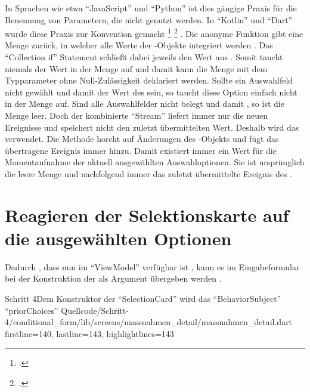 In Sprachen wie etwa \enquote{JavaScript} und \enquote{Python} ist dies gängige Praxis für die Benennung von Parametern,
die nicht genutzt werden.
In \enquote{Kotlin} und \enquote{Dart} wurde diese Praxis zur Konvention gemacht
\footcite[Vgl.][]{DartEffectiveDartStylePREFERusingUnderscore}
\footcite[Vgl.][]{KotlinHighOrderFunctionsAndLambdasUnderscoreForUnusedVariables}
. 
Die anonyme Funktion gibt eine Menge zurück,
in welcher alle Werte der -Objekte integriert werden .
Das \enquote{Collection if} Statement schließt dabei jeweils den Wert  aus .
Somit taucht niemals der Wert  in der Menge auf und damit kann die Menge mit dem Typparameter  ohne Null-Zulässigkeit deklariert werden.
Sollte ein Auswahlfeld nicht gewählt und damit der Wert des   sein,
so taucht diese Option einfach nicht in der Menge auf.
Sind alle Auswahlfelder nicht belegt und damit ,
so ist die Menge leer.
Doch der kombinierte \enquote{Stream}  liefert immer nur die neuen Ereignisse und speichert nicht den zuletzt übermittelten Wert.
Deshalb wird das   verwendet.
Die Methode  horcht auf Änderungen des -Objekts und fügt das übertragene Ereignis immer  hinzu. 
Damit existiert immer ein Wert für die Momentaufnahme der aktuell ausgewählten Auswahloptionen.
Sie ist ursprünglich die leere Menge \IC{{}} und nachfolgend immer das zuletzt übermittelte Ereignis des .

\section{Reagieren der Selektionskarte auf die ausgewählten Optionen}

Dadurch
, dass  nun im \enquote{ViewModel} verfügbar ist
, kann es im Eingabeformular bei der Konstruktion der  als Argument übergeben werden .

\begin{alexlisting}{Schritt 4}{Dem Konstruktor der \enquote{SelectionCard} wird das \enquote{BehaviorSubject} \enquote{priorChoices}}
  {Quellcode/Schritt-4/conditional_form/lib/screens/massnahmen_detail/massnahmen_detail.dart}
  {firstline=140, lastline=143, highlightlines={143}}
  \label{lst:Schritt4builderSelectionCard}
\end{alexlisting}

